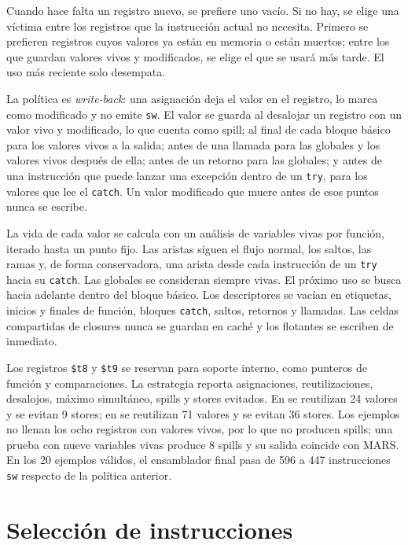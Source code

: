 \documentclass[11pt,letterpaper,oneside]{report}
\newcommand{\codigo}[1]{\texttt{#1}}
\newcommand{\archivo}[1]{\path{#1}}
\begin{document}
Cuando hace falta un registro nuevo, se prefiere uno vac\'io. Si no hay, se elige una v\'ictima entre los registros que la instrucci\'on actual no necesita. Primero se prefieren registros cuyos valores ya est\'an en memoria o est\'an muertos; entre los que guardan valores vivos y modificados, se elige el que se usar\'a m\'as tarde. El uso m\'as reciente solo desempata.

La pol\'itica es \emph{write-back}: una asignaci\'on deja el valor en el registro, lo marca como modificado y no emite \codigo{sw}. El valor se guarda al desalojar un registro con un valor vivo y modificado, lo que cuenta como spill; al final de cada bloque b\'asico para los valores vivos a la salida; antes de una llamada para las globales y los valores vivos despu\'es de ella; antes de un retorno para las globales; y antes de una instrucci\'on que puede lanzar una excepci\'on dentro de un \codigo{try}, para los valores que lee el \codigo{catch}. Un valor modificado que muere antes de esos puntos nunca se escribe.

La vida de cada valor se calcula con un an\'alisis de variables vivas por funci\'on, iterado hasta un punto fijo. Las aristas siguen el flujo normal, los saltos, las ramas y, de forma conservadora, una arista desde cada instrucci\'on de un \codigo{try} hacia su \codigo{catch}. Las globales se consideran siempre vivas. El pr\'oximo uso se busca hacia adelante dentro del bloque b\'asico. Los descriptores se vac\'ian en etiquetas, inicios y finales de funci\'on, bloques \codigo{catch}, saltos, retornos y llamadas. Las celdas compartidas de closures nunca se guardan en cach\'e y los flotantes se escriben de inmediato.

Los registros \codigo{\$t8} y \codigo{\$t9} se reservan para soporte interno, como punteros de funci\'on y comparaciones. La estrategia reporta asignaciones, reutilizaciones, desalojos, m\'aximo simult\'aneo, spills y stores evitados. En \archivo{13\_programa\_integral.cps} se reutilizan 24 valores y se evitan 9 stores; en \archivo{valid\_complete.cps} se reutilizan 71 valores y se evitan 36 stores. Los ejemplos no llenan los ocho registros con valores vivos, por lo que no producen spills; una prueba con nueve variables vivas produce 8 spills y su salida coincide con MARS. En los 20 ejemplos v\'alidos, el ensamblador final pasa de 596 a 447 instrucciones \codigo{sw} respecto de la pol\'itica anterior.
\section{Selecci\'on de instrucciones}
\end{document}

